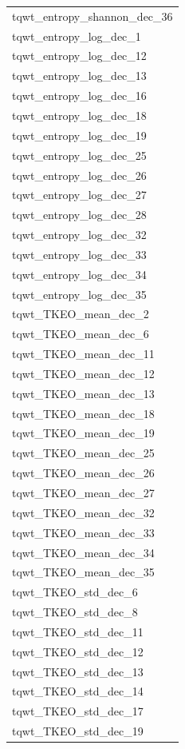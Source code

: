 \documentclass[
]{article}
\begin{document}
\begin{table}
\begin{tabular}{l}
tqwt\_entropy\_shannon\_dec\_36\\
tqwt\_entropy\_log\_dec\_1\\
\addlinespace
tqwt\_entropy\_log\_dec\_12\\
tqwt\_entropy\_log\_dec\_13\\
tqwt\_entropy\_log\_dec\_16\\
tqwt\_entropy\_log\_dec\_18\\
tqwt\_entropy\_log\_dec\_19\\
\addlinespace
tqwt\_entropy\_log\_dec\_25\\
tqwt\_entropy\_log\_dec\_26\\
tqwt\_entropy\_log\_dec\_27\\
tqwt\_entropy\_log\_dec\_28\\
tqwt\_entropy\_log\_dec\_32\\
\addlinespace
tqwt\_entropy\_log\_dec\_33\\
tqwt\_entropy\_log\_dec\_34\\
tqwt\_entropy\_log\_dec\_35\\
tqwt\_TKEO\_mean\_dec\_2\\
tqwt\_TKEO\_mean\_dec\_6\\
\addlinespace
tqwt\_TKEO\_mean\_dec\_11\\
tqwt\_TKEO\_mean\_dec\_12\\
tqwt\_TKEO\_mean\_dec\_13\\
tqwt\_TKEO\_mean\_dec\_18\\
tqwt\_TKEO\_mean\_dec\_19\\
\addlinespace
tqwt\_TKEO\_mean\_dec\_25\\
tqwt\_TKEO\_mean\_dec\_26\\
tqwt\_TKEO\_mean\_dec\_27\\
tqwt\_TKEO\_mean\_dec\_32\\
tqwt\_TKEO\_mean\_dec\_33\\
\addlinespace
tqwt\_TKEO\_mean\_dec\_34\\
tqwt\_TKEO\_mean\_dec\_35\\
tqwt\_TKEO\_std\_dec\_6\\
tqwt\_TKEO\_std\_dec\_8\\
tqwt\_TKEO\_std\_dec\_11\\
\addlinespace
tqwt\_TKEO\_std\_dec\_12\\
tqwt\_TKEO\_std\_dec\_13\\
tqwt\_TKEO\_std\_dec\_14\\
tqwt\_TKEO\_std\_dec\_17\\
tqwt\_TKEO\_std\_dec\_19\\

\end{tabular}
\end{table}
\end{document}
